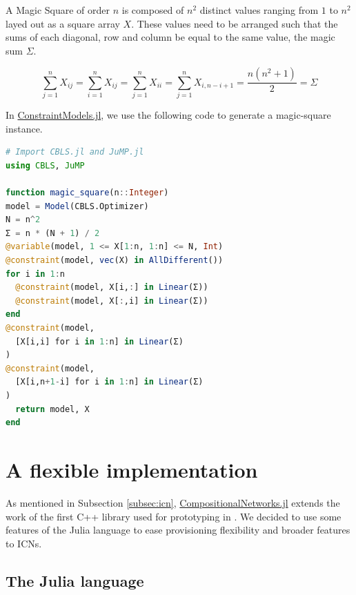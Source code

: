 \documentclass{juliacon}
\newcommand{\cnjl}{\href{https://github.com/JuliaConstraints/CompositionalNetworks.jl}{CompositionalNetworks.jl}\xspace}
\newcommand{\cmjl}{\href{https://github.com/JuliaConstraints/ConstraintModels.jl}{ConstraintModels.jl}\xspace}
\begin{document}
A Magic Square of order $n$ is composed of $n^2$ distinct values ranging from $1$ to $n^2$ layed out as a square array $X$.  These values need to be arranged such that the sums of each diagonal, row and column be equal to the same value, the magic sum $\Sigma$.

\[ \sum_{j=1}^{n} X_{ij} = \sum_{i=1}^{n} X_{ij} = \sum_{j=1}^{n} X_{ii} = \sum_{j=1}^{n} X_{i,n-i+1} = \frac{n(n^{2}+1)}{2} = \Sigma \]

In \cmjl, we use the following code to generate a magic-square instance.

\begin{lstlisting}[language = Julia]
# Import CBLS.jl and JuMP.jl
using CBLS, JuMP

function magic_square(n::Integer)
model = Model(CBLS.Optimizer)
N = n^2
Σ = n * (N + 1) / 2
@variable(model, 1 <= X[1:n, 1:n] <= N, Int)
@constraint(model, vec(X) in AllDifferent())
for i in 1:n
  @constraint(model, X[i,:] in Linear(Σ))
  @constraint(model, X[:,i] in Linear(Σ))
end
@constraint(model,
  [X[i,i] for i in 1:n] in Linear(Σ)
)
@constraint(model,
  [X[i,n+1-i] for i in 1:n] in Linear(Σ)
)
  return model, X
end
\end{lstlisting}

\section{A flexible implementation}
\label{sec:implementation}

As mentioned in Subsection \ref{subsec:icn}, \cnjl extends the work of the first C++ library used for prototyping in \cite{richoux2020automatic}. We decided to use some features of the Julia language to ease provisioning flexibility and broader features to ICNs.

\subsection{The Julia language}
\label{subsec:julialang}
\end{document}
